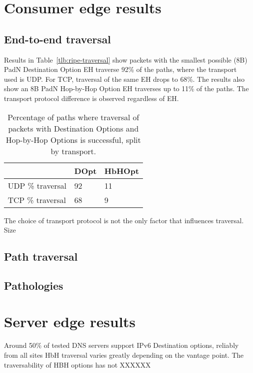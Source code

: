 \documentclass[conference]{IEEEtran}
\begin{document}
\section{Consumer edge results} 
\label{sec:ripe-results}

\subsection{End-to-end traversal}

Results in Table~\ref{tlb:ripe-traversal} show packets with the smallest possible (8B) PadN Destination Option EH traverse 92\% of the paths, where the transport used is UDP. For TCP, traversal of the same EH drops to 68\%. The results also show an 8B PadN Hop-by-Hop Option EH traverses up to 11\% of the paths. The transport protocol difference is observed regardless of EH.

\begin{table}[]
\centering
\begin{tabular}{l|l|l}
\hline
                                                           & DOpt & HbHOpt \\ \hline
UDP \% traversal & 92   & 11     \\ 
\hline
TCP \% traversal & 68   & 9      \\ 
\hline
\end{tabular}
\label{tbl:ripe-traversal}
\caption{Percentage of paths where traversal of packets with Destination Options and Hop-by-Hop Options is successful, split by transport.}
\end{table}


The choice of transport protocol is not the only factor that influences traversal. Size 


\subsection{Path traversal}
\subsection{Pathologies}


\section{Server edge results} 
\label{sec:alexa-results}




Around 50\% of tested DNS servers support IPv6 Destination options, reliably from all sites
HbH traversal varies greatly depending on the vantage point.
The traversability of HBH options has not XXXXXX
\end{document}
